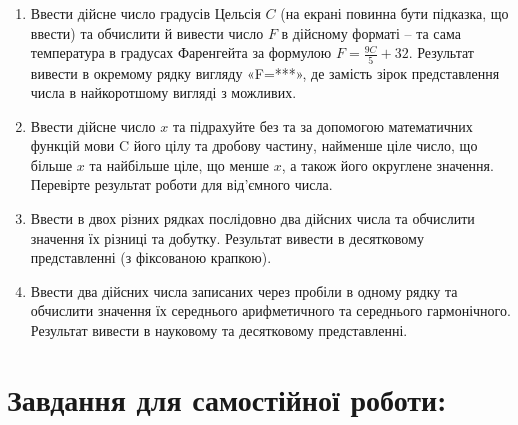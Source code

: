 \documentclass[a5paper,titlepage,openany,twoside,draft]{book_unv}%
\begin{document}
\begin{enumerate}
\item
  Ввести дійсне число градусів Цельсія $C$ (на екрані повинна бути
  підказка, що ввести) та обчислити й вивести число $F$ в дійсному форматі
  -- та сама температура в градусах Фаренгейта за формулою $F = \frac{9C}{5} + 32 $.
 Результат вивести в окремому рядку вигляду «F=***», де замість зірок представлення числа в найкоротшому вигляді
  з можливих.

\item
  Ввести дійсне число $x$ та підрахуйте без та за допомогою математичних
  функцій мови C його цілу та дробову частину, найменше ціле число, що більше
  $x$ та найбільше ціле, що менше $x$, а також його округлене значення.
  Перевірте результат роботи для від'ємного числа.
\item
  Ввести в двох різних рядках послідовно два дійсних числа та обчислити
  значення їх різниці та добутку. Результат вивести в десятковому
  представленні (з фіксованою крапкою).
\item
  Ввести два дійсних числа записаних через пробіли в одному рядку та
  обчислити значення їх середнього арифметичного та середнього
  гармонічного. Результат вивести в науковому та десятковому
  представленні.
\end{enumerate}

\section{Завдання для самостійної роботи:}
\end{document}
